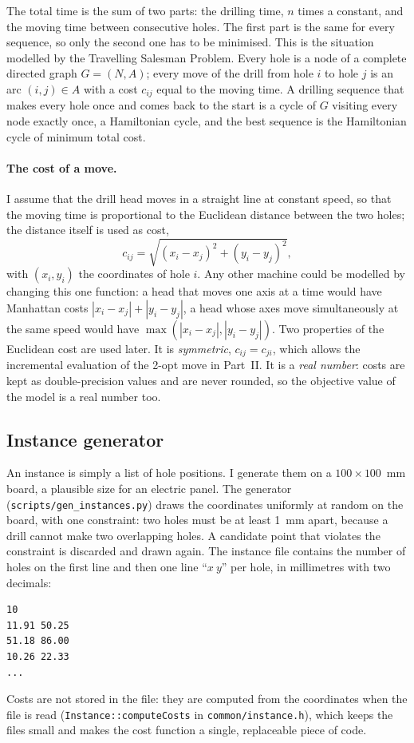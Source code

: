 \documentclass[11pt,a4paper]{article}
\begin{document}
The total time is the sum of two parts: the drilling time, $n$ times a constant, and the
moving time between consecutive holes. The first part is the same for every sequence, so
only the second one has to be minimised. This is the situation modelled by the Travelling
Salesman Problem. Every hole is a node of a complete directed graph $G=(N,A)$; every move of
the drill from hole $i$ to hole $j$ is an arc $(i,j)\in A$ with a cost $c_{ij}$ equal to the
moving time. A drilling sequence that makes every hole once and comes back to the start is a
cycle of $G$ visiting every node exactly once, a Hamiltonian cycle, and the best sequence is
the Hamiltonian cycle of minimum total cost.

\paragraph{The cost of a move.}
I assume that the drill head moves in a straight line at constant speed, so that the moving
time is proportional to the Euclidean distance between the two holes; the distance itself is
used as cost,
\[
  c_{ij} = \sqrt{(x_i-x_j)^2+(y_i-y_j)^2},
\]
with $(x_i,y_i)$ the coordinates of hole $i$. Any other machine could be modelled by changing
this one function: a head that moves one axis at a time would have Manhattan costs
$|x_i-x_j|+|y_i-y_j|$, a head whose axes move simultaneously at the same speed would have
$\max(|x_i-x_j|,|y_i-y_j|)$. Two properties of the Euclidean cost are used later. It is
\emph{symmetric}, $c_{ij}=c_{ji}$, which allows the incremental evaluation of the 2-opt move in
Part~II. It is a \emph{real number}: costs are kept as double-precision values and are never
rounded, so the objective value of the model is a real number too.

\subsection{Instance generator}\label{sec:gen}
An instance is simply a list of hole positions. I generate them on a $100\times100$~mm board,
a plausible size for an electric panel. The generator (\texttt{scripts/gen\_instances.py})
draws the coordinates uniformly at random on the board, with one constraint: two holes must be
at least 1~mm apart, because a drill cannot make two overlapping holes. A candidate point that
violates the constraint is discarded and drawn again. The instance file contains the number of
holes on the first line and then one line ``$x\ y$'' per hole, in millimetres with two
decimals:
\begin{verbatim}
10
11.91 50.25
51.18 86.00
10.26 22.33
...
\end{verbatim}
Costs are not stored in the file: they are computed from the coordinates when the file is read
(\texttt{Instance::computeCosts} in \texttt{common/instance.h}), which keeps the files small
and makes the cost function a single, replaceable piece of code.
\end{document}
